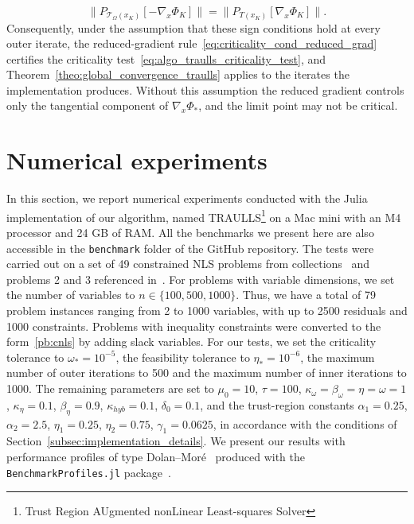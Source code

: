 \documentclass{article}
\numberwithin{equation}{section}
\newcommand{\calT}{{\mathcal{T}}}
\theoremstyle{plain}
\begin{document}
	\[\|P_{\calT_\Omega(x_K)}[-\nabla_x\Phi_K]\|=\|P_{T(x_K)}[\nabla_x\Phi_K]\|.\] 
	Consequently, under the assumption that these sign conditions hold at every outer iterate, the reduced-gradient rule~\eqref{eq:criticality_cond_reduced_grad} certifies the criticality test~\eqref{eq:algo_traulls_criticality_test}, and Theorem~\ref{theo:global_convergence_traulls} applies to the iterates the implementation produces. Without this assumption the reduced gradient controls only the tangential component of $\nabla_x\Phi_*$, and the limit point may not be critical.
	
	\section{Numerical experiments}\label{sec:numerical_experiments}
	
	In this section, we report numerical experiments conducted with the Julia implementation of our algorithm, named TRAULLS\footnote{Trust Region AUgmented nonLinear Least-squares Solver} on a Mac mini with an M4 processor and 24 GB of RAM. All the benchmarks we present here are also accessible in the \texttt{benchmark} folder of the GitHub repository.
	The tests were carried out on a set of 49 constrained NLS problems from collections~\cite{hockschittkowski:1980, schittkowski:1987, lucksanvlcek:1999} and problems 2 and 3 referenced in~\cite{biegler-etal2000}. For problems with variable dimensions, we set the number of variables to $n \in \{100, 500, 1000\}$. Thus, we have a total of 79 problem instances ranging from 2 to 1000 variables, with up to 2500 residuals and 1000 constraints. Problems with inequality constraints were converted to the form~\eqref{pb:cnls} by adding slack variables. For our tests, we set the criticality tolerance to $\omega_* = 10^{-5}$, the feasibility tolerance to $\eta_* = 10^{-6}$, the maximum number of outer iterations to 500 and the maximum number of inner iterations to 1000. The remaining parameters are set to $\mu_0 = 10$, $\tau = 100$, $\kappa_\omega = \beta_\omega = \eta = \omega = 1$, $\kappa_\eta = 0.1$, $\beta_\eta = 0.9$, $\kappa_{hyb} = 0.1$, $\delta_0 = 0.1$, and the trust-region constants $\alpha_1 = 0.25$, $\alpha_2 = 2.5$, $\eta_1 = 0.25$, $\eta_2 = 0.75$, $\gamma_1 = 0.0625$, in accordance with the conditions of Section~\ref{subsec:implementation_details}. We present our results with performance profiles of type Dolan--Mor\'e~\cite{dolanmore:2002} produced with the \texttt{BenchmarkProfiles.jl} package~\cite{benchmark-profiles-julia}.
	
\end{document}
